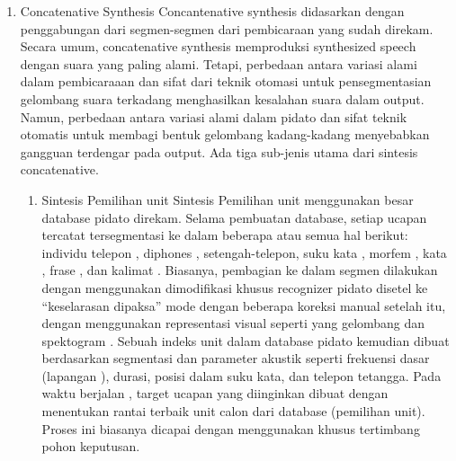 \begin{enumerate}
\item Concatenative Synthesis
Concantenative synthesis didasarkan dengan penggabungan dari segmen-segmen dari pembicaraan yang sudah direkam. Secara umum, concatenative synthesis memproduksi synthesized speech dengan suara yang paling alami. Tetapi, perbedaan antara variasi alami dalam pembicaraaan dan sifat dari teknik otomasi untuk pensegmentasian gelombang suara terkadang menghasilkan kesalahan suara dalam output. Namun, perbedaan antara variasi alami dalam pidato dan sifat teknik otomatis untuk membagi bentuk gelombang kadang-kadang menyebabkan gangguan terdengar pada output. Ada tiga sub-jenis utama dari sintesis concatenative.
\begin{enumerate}
\item Sintesis Pemilihan unit
Sintesis Pemilihan unit menggunakan besar database pidato direkam. Selama pembuatan database, setiap ucapan tercatat tersegmentasi ke dalam beberapa atau semua hal berikut: individu telepon , diphones , setengah-telepon, suku kata , morfem , kata , frase , dan kalimat . Biasanya, pembagian ke dalam segmen dilakukan dengan menggunakan dimodifikasi khusus recognizer pidato disetel ke “keselarasan dipaksa” mode dengan beberapa koreksi manual setelah itu, dengan menggunakan representasi visual seperti yang gelombang dan spektogram .  Sebuah indeks unit dalam database pidato kemudian dibuat berdasarkan segmentasi dan parameter akustik seperti frekuensi dasar (lapangan ), durasi, posisi dalam suku kata, dan telepon tetangga. Pada waktu berjalan , target ucapan yang diinginkan dibuat dengan menentukan rantai terbaik unit calon dari database (pemilihan unit). Proses ini biasanya dicapai dengan menggunakan khusus tertimbang pohon keputusan.


\end{enumerate}
\end{enumerate}
